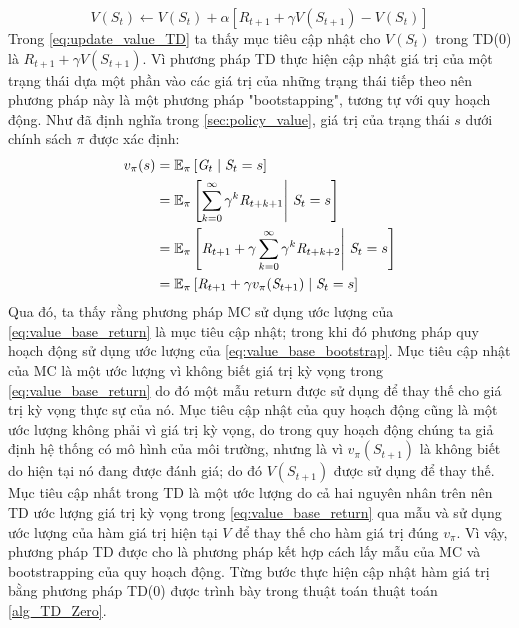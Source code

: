 \begin{equation}
V(\mathit{S}_t) \leftarrow 	V(\mathit{S}_t) + \alpha[\mathit{R}_{t+1} + \gamma V(\mathit{S}_{t+1}) - V(\mathit{S}_t)]
\label{eq:update_value_TD}
\end{equation}
Trong \ref{eq:update_value_TD} ta thấy mục tiêu cập nhật cho $V(\mathit{S}_t)$ trong TD(0) là $\mathit{R}_{t+1} + \gamma V(\mathit{S}_{t+1})$. Vì phương pháp TD thực hiện cập nhật giá trị của một trạng thái dựa một phần vào các giá trị của những trạng thái tiếp theo nên phương pháp này là một phương pháp "bootstapping", tương tự với quy hoạch động. Như đã định nghĩa trong \ref{sec:policy_value}, giá trị của trạng thái $s$ dưới chính sách $\pi$ được xác định:
\begin{align}
v_{\pi}(s) = {} & \mathbb{E}_{\pi}\left [\mathit{G}_t \mid \mathit{S}_{t} = s\right ] \label{eq:value_base_return} \\
={} & \mathbb{E}_{\pi}\left [\sum_{k = 0}^{\infty}\gamma^{k}\mathit{R}_{t+k+1} \middle|\ \mathit{S}_t= s\right ] \notag \\
= {} & \mathbb{E}_{\pi}\left [\mathit{R}_{t+1} + \gamma \sum_{k = 0}^{\infty}\gamma^{k}\mathit{R}_{t+k+2} \middle|\ \mathit{S}_t= s\right ] \notag \\
= {} & \mathbb{E}_{\pi} \left[\mathit{R}_{t+1} + \gamma v_{\pi}(\mathit{S}_{t+1}) \mid \mathit{S}_t = s\right] \label{eq:value_base_bootstrap}
\end{align}
Qua đó, ta thấy rằng phương pháp MC sử dụng ước lượng của \ref{eq:value_base_return} là mục tiêu cập nhật; trong khi đó phương pháp quy hoạch động sử dụng ước lượng của \ref{eq:value_base_bootstrap}. Mục tiêu cập nhật của MC là một ước lượng vì không biết giá trị kỳ vọng trong \ref{eq:value_base_return} do đó một mẫu return được sử dụng để thay thế cho giá trị kỳ vọng thực sự của nó. Mục tiêu cập nhật của quy hoạch động cũng là một ước lượng không phải vì giá trị kỳ vọng, do trong quy hoạch động chúng ta giả định hệ thống có mô hình của môi trường, nhưng là vì $v_{\pi}(\mathit{S}_{t+1})$ là không biết do hiện tại nó đang được đánh giá; do đó $V(\mathit{S}_{t+1})$ được sử dụng để thay thế. Mục tiêu cập nhất trong TD là một ước lượng do cả hai nguyên nhân trên nên TD ước lượng giá trị kỳ vọng trong \ref{eq:value_base_return} qua mẫu và sử dụng ước lượng của hàm giá trị hiện tại $V$ để thay thế cho hàm giá trị đúng $v_{\pi}$. Vì vậy, phương pháp TD được cho là phương pháp kết hợp cách lấy mẫu của MC và bootstrapping của quy hoạch động. Từng bước thực hiện cập nhật hàm giá trị bằng phương pháp TD(0) được trình bày trong thuật toán thuật toán \ref{alg_TD_Zero}.
